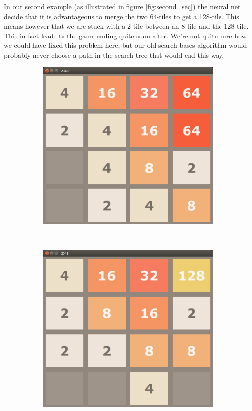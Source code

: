 \documentclass[11pt,a4paper]{article}
\begin{document}
In our second example (as illustrated in figure \ref{fig:second_seq}) the neural net decide that it is advantageous to merge the two 64-tiles to get a 128-tile. This means however that we are stuck with a 2-tile between an 8-tile and the 128 tile. This in fact leads to the game ending quite soon after. We're not quite sure how we could have fixed this problem here, but our old search-bases algorithm would probably never choose a path in the search tree that would end this way.

\begin{figure}[h!]
    \centering
    \begin{subfigure}[b]{0.45\textwidth}
        \includegraphics[width=\textwidth]{figures/64}
    \end{subfigure}
    ~
    \begin{subfigure}[b]{0.45\textwidth}
        \includegraphics[width=\textwidth]{figures/128}

\end{subfigure}
\end{figure}
\end{document}
